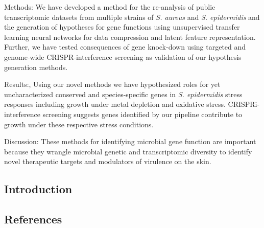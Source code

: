 Methods: We have developed a method for the re-analysis of public transcriptomic datasets from multiple strains of \emph{S. aureus} and \emph{S. epidermidis} and the generation of hypotheses for gene functions using unsupervised transfer learning neural networks for data compression and latent feature representation. Further, we have tested consequences of gene knock-down using targeted and genome-wide CRISPR-interference screening as validation of our hypothesis generation methods.

Results:, Using our novel methods we have hypothesized roles for yet uncharacterized conserved and species-specific genes in \emph{S. epidermidis} stress responses including growth under metal depletion and oxidative stress. CRISPRi-interference screening suggests genes identified by our pipeline contribute to growth under these respective stress conditions.

Discussion: These methods for identifying microbial gene function are important because they wrangle microbial genetic and transcriptomic diversity to identify novel therapeutic targets and modulators of virulence on the skin.

\hypertarget{introduction}{%
\subsection{Introduction}\label{introduction}}

\hypertarget{references}{%
\subsection{References}\label{references}}

\hypertarget{refs}{}
\begin{CSLReferences}{0}{0}
\end{CSLReferences}
